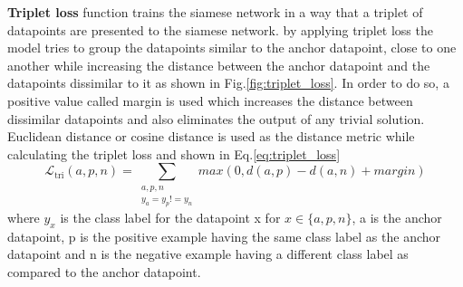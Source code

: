\textbf{Triplet loss} function trains the siamese network in a way that a triplet of datapoints are presented to the siamese network. by applying triplet loss the model tries to group the datapoints similar to the anchor datapoint, close to one another while increasing the distance between the anchor datapoint and the datapoints dissimilar to it as shown in Fig.\ref*{fig:triplet_loss}. In order to do so, a positive value called margin is used which increases the distance between dissimilar datapoints and also eliminates the output of any trivial solution. Euclidean distance or cosine distance is used as the distance metric while calculating the triplet loss and shown in Eq.\ref*{eq:triplet_loss}
\begin{equation}
  \label{eq:triplet_loss}
  \mathcal{L}_{\textrm{tri}}(a,p,n)=\sum_{\substack{a,p,n \\ y_{a}=y_{p}!=y_{n}}} max(0,d(a,p)-d(a,n)+margin)
\end{equation}
where $y_{x}$ is the class label for the datapoint x for $x \in \{a,p,n\}$, a is the anchor datapoint, p is the positive example having the same class label as the anchor datapoint and n is the negative example having a different class label as compared to the anchor datapoint.

